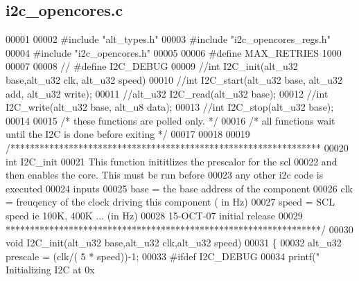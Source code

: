 \subsection{i2c\+\_\+opencores.\+c}
\label{software_2lms__ctr__app_2i2c__opencores_8c_source}

\begin{DoxyCode}
00001 
00002 \textcolor{preprocessor}{#include "alt_types.h"}
00003 \textcolor{preprocessor}{#include "i2c_opencores_regs.h"}
00004 \textcolor{preprocessor}{#include "i2c_opencores.h"}
00005 
00006 \textcolor{preprocessor}{#define MAX\_RETRIES 1000}
00007 
00008 \textcolor{comment}{// #define I2C\_DEBUG}
00009 \textcolor{comment}{//int I2C\_init(alt\_u32 base,alt\_u32 clk, alt\_u32 speed)}
00010 \textcolor{comment}{//int I2C\_start(alt\_u32 base, alt\_u32 add, alt\_u32 write);}
00011 \textcolor{comment}{//alt\_u32 I2C\_read(alt\_u32 base);}
00012 \textcolor{comment}{//int I2C\_write(alt\_u32 base, alt\_u8 data);}
00013 \textcolor{comment}{//int I2C\_stop(alt\_u32 base);}
00014 
00015 \textcolor{comment}{/* these functions are polled only.  */}
00016 \textcolor{comment}{/* all functions wait until the I2C is done before exiting */}
00017 
00018 
00019 \textcolor{comment}{/****************************************************************}
00020 \textcolor{comment}{int I2C\_init}
00021 \textcolor{comment}{            This function inititlizes the prescalor for the scl}
00022 \textcolor{comment}{            and then enables the core. This must be run before}
00023 \textcolor{comment}{            any other i2c code is executed}
00024 \textcolor{comment}{inputs}
00025 \textcolor{comment}{      base = the base address of the component}
00026 \textcolor{comment}{      clk = freuqency of the clock driving this component  ( in Hz)}
00027 \textcolor{comment}{      speed = SCL speed ie 100K, 400K ...            (in Hz)}
00028 \textcolor{comment}{15-OCT-07 initial release}
00029 \textcolor{comment}{*****************************************************************/}
00030 \textcolor{keywordtype}{void} I2C_init(alt_u32 base,alt_u32 clk,alt_u32 speed)
00031 \{
00032   alt_u32 prescale = (clk/( 5 * speed))-1;
00033 \textcolor{preprocessor}{#ifdef  I2C\_DEBUG}
00034         printf(\textcolor{stringliteral}{" Initializing  I2C at 0x%
}
\end{DoxyCode}
